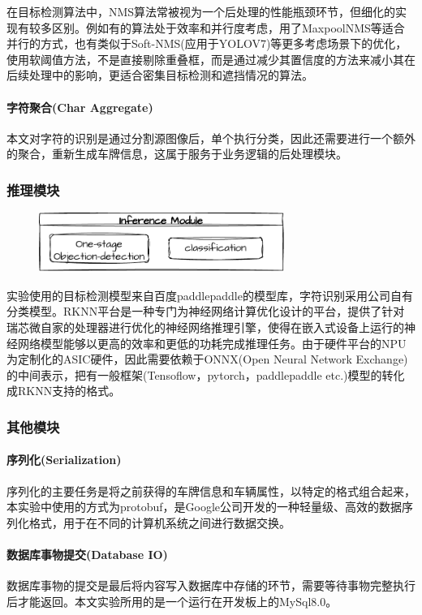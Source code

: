 \documentclass[master,anonymous]{shtthesis}
\begin{document}
在目标检测算法中，NMS算法常被视为一个后处理的性能瓶颈环节，但细化的实现有较多区别。例如有的算法处于效率和并行度考虑，用了MaxpoolNMS等适合并行的方式，也有类似于Soft-NMS(应用于YOLOV7)等更多考虑场景下的优化，使用软阈值方法，不是直接剔除重叠框，而是通过减少其置信度的方法来减小其在后续处理中的影响，更适合密集目标检测和遮挡情况的算法。

\paragraph{字符聚合(Char Aggregate)}
本文对字符的识别是通过分割源图像后，单个执行分类，因此还需要进行一个额外的聚合，重新生成车牌信息，这属于服务于业务逻辑的后处理模块。



\subsubsection{推理模块}
\begin{figure}[H]
	\centering
	\includegraphics[width=8cm]{img/m3.pdf}
	\label{推理模块汇总}
\end{figure}
实验使用的目标检测模型来自百度paddlepaddle的模型库，字符识别采用公司自有分类模型。RKNN平台是一种专门为神经网络计算优化设计的平台，提供了针对瑞芯微自家的处理器进行优化的神经网络推理引擎，使得在嵌入式设备上运行的神经网络模型能够以更高的效率和更低的功耗完成推理任务。由于硬件平台的NPU为定制化的ASIC硬件，因此需要依赖于ONNX(Open Neural Network Exchange)的中间表示，把有一般框架(Tensoflow，pytorch，paddlepaddle etc.)模型的转化成RKNN支持的格式。

\subsubsection{其他模块}
\paragraph{序列化(Serialization)}
序列化的主要任务是将之前获得的车牌信息和车辆属性，以特定的格式组合起来，本实验中使用的方式为protobuf，是Google公司开发的一种轻量级、高效的数据序列化格式，用于在不同的计算机系统之间进行数据交换。

\paragraph{数据库事物提交(Database IO)}
数据库事物的提交是最后将内容写入数据库中存储的环节，需要等待事物完整执行后才能返回。本文实验所用的是一个运行在开发板上的MySql8.0。
\end{document}

